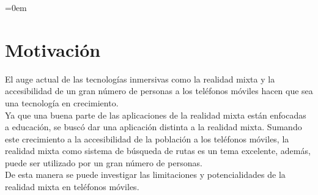 \parindent=0em
\section{Motivación}
\noindent

El auge actual de las tecnologías inmersivas como la realidad mixta y la accesibilidad de un gran número de personas a los teléfonos móviles hacen que sea una tecnología en crecimiento.\\

Ya que una buena parte de las aplicaciones de la realidad mixta están enfocadas a educación, se buscó dar una aplicación distinta a la realidad mixta. Sumando este crecimiento a la accesibilidad de la población a los teléfonos móviles, la realidad mixta como sistema de búsqueda de rutas es un tema excelente, además, puede ser utilizado por un gran número de personas.\\

De esta manera se puede investigar las limitaciones y potencialidades de la realidad mixta en teléfonos móviles.
